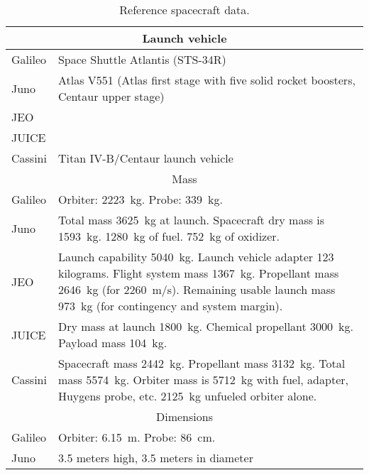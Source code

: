 \begin{longtable}{lp{}}
  \caption{Reference spacecraft data.} \\

  \multicolumn{2}{c}{Launch vehicle} \\ \midrule

  Galileo & Space Shuttle Atlantis (STS-34R) \\

  Juno & Atlas V551 (Atlas first stage with five solid rocket
  boosters, Centaur upper stage) \\

  JEO & \\

  JUICE & \\

  Cassini & Titan IV-B/Centaur launch vehicle \\

  \multicolumn{2}{c}{Mass} \\ \midrule

  Galileo & Orbiter: \SI{2223}{kg}. Probe: \SI{339}{kg}. \\

  Juno & Total mass \SI{3625}{kg} at launch. Spacecraft dry mass is
  \SI{1593}{kg}. \SI{1280}{kg} of fuel. \SI{752}{kg} of oxidizer. \\

  JEO & Launch capability \SI{5040}{kg}. Launch vehicle adapter 123
  kilograms. Flight system mass \SI{1367}{kg}. Propellant mass
  \SI{2646}{kg} (for \SI{2260}{m/s}). Remaining usable launch mass
  \SI{973}{kg} (for contingency and system margin). \\

  JUICE & Dry mass at launch \SI{1800}{kg}. Chemical propellant
  \SI{3000}{kg}. Payload mass \SI{104}{kg}. \\

  Cassini & Spacecraft mass \SI{2442}{kg}. Propellant mass
  \SI{3132}{kg}. Total mass \SI{5574}{kg}. Orbiter mass is
  \SI{5712}{kg} with fuel, adapter, Huygens probe, etc. \SI{2125}{kg}
  unfueled orbiter alone. \\

  \multicolumn{2}{c}{Dimensions} \\ \midrule

  Galileo & Orbiter: \SI{6.15}{m}. Probe: \SI{86}{cm}. \\

  Juno & 3.5 meters high, 3.5 meters in diameter \\


\end{longtable}
